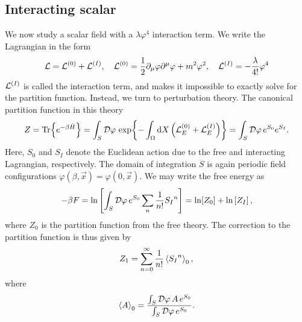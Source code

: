 \subsection{Interacting scalar}

We now study a scalar field with a $\lambda \varphi^4$ interaction term.
We write the Lagrangian in the form
\begin{equation*}
    \mathcal{L} = \mathcal{L}^{(0)} + \mathcal{L}^{(I)}, \quad 
    \mathcal{L}^{(0)} = 
    \frac{1}{2} \partial_\mu \varphi \partial^\mu \varphi  + m^2 \varphi^2 , \quad
    \mathcal{L}^{(I)} = - \frac{\lambda}{4!} \varphi^4
\end{equation*}
$\mathcal{L}^{(I)}$ is called the interaction term, and makes it impossible to exactly solve for the partition function.
Instead, we turn to perturbation theory.
The canonical partition function in this theory
\begin{equation}
    Z = \Tr{e^{- \beta \hat H}}
    = \int_S \mathcal{D} \varphi \, \exp{
        - \int_\Omega \dd X \left(\mathcal{L}_E^{(0)} + \mathcal{L}_E^{(I)}\right)
    }
    = \int_S \mathcal{D} \varphi \, e^{S_0} e^{S_I}.
\end{equation}
Here, $S_0$ and $S_I$ denote the Euclidean action due to the free and interacting Lagrangian, respectively.
The domain of integration $S$ is again periodic field configurations $\varphi(\beta, \vec x) = \varphi(0, \vec x)$.
We may write the free energy as
\begin{equation*}
    - \beta F = \ln
    \left[
        \int_S \mathcal{D} \varphi \, e^{S_0} \sum_n \frac{1}{n!} {S_I}^n
    \right]
    = \ln[Z_0] 
    + \ln
    \left[
        Z_I
    \right],
\end{equation*}
where $Z_0$ is the partition function from the free theory.
The correction to the partition function is thus given by
\begin{equation}
    Z_1 = \sum_{n=0}^\infty \frac{1}{n!} \ex{{S_I}^n}_0,
\end{equation}
where
\begin{equation}
    \ex{A}_0 = \frac{
        \int_S \D \varphi \, A \, e^{S_0} }
    {\int_S \D \varphi \, e^{S_0}}.
\end{equation}
